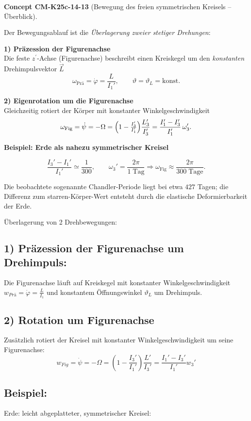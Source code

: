 \documentclass[10pt, letterpaper]{article}
\newcommand{\CustomHeading}[3]{%
  \par\medskip\noindent%
  \textbf{#1 #2} \textnormal{(#3)}.\enskip%
}
\newenvironment{CONC}[2]{\begin{unitbox}\CustomHeading{Concept}{#1}{#2}}{\end{unitbox}}
\begin{document}
\begin{CONC}{CM-K25c-14-13}{Bewegung des freien symmetrischen Kreisels – Überblick}
Der Bewegungsablauf ist die \emph{Überlagerung zweier stetiger Drehungen}:

\textbf{1) Präzession der Figurenachse}\\
Die feste $z^{\prime}$-Achse (Figurenachse) beschreibt einen Kreiskegel um den \emph{konstanten} Drehimpuls­vektor $\vec L$  
\[
\omega_{\text{Prä}}=\dot{\varphi}= \frac{L}{I_1'},
\qquad
\vartheta=\vartheta_L=\text{konst}.
\]

\textbf{2) Eigenrotation um die Figurenachse}\\
Gleichzeitig rotiert der Körper mit konstanter Winkelgeschwindigkeit  
\[
\omega_{\text{Fig}}=\dot{\psi}
          =-\Omega
          =\Bigl(1-\tfrac{I_3'}{I_1'}\Bigr)\frac{L_3'}{I_3'}
          =\frac{I_1'-I_3'}{I_1'}\,\omega_3'.
\]

\bigskip
\textbf{Beispiel: Erde als nahezu symmetrischer Kreisel}

\[
\frac{I_3'-I_1'}{I_1'}\simeq\frac{1}{300},
\qquad
\omega_3'=\frac{2\pi}{1\;\text{Tag}}
\Longrightarrow
\omega_{\text{Fig}}\approx\frac{2\pi}{300\;\text{Tage}}.
\]

Die beobachtete sogenannte Chandler-Periode liegt bei etwa $427$ Tagen; die Differenz zum starren-Körper-Wert entsteht durch die elastische Deformierbarkeit der Erde.
\end{CONC}





Überlagerung von 2 Drehbewegungen:


\subsection*{1) Präzession der Figurenachse um Drehimpuls:}
Die Figurenachse läuft auf Kreiskegel mit konstanter Winkelgeschwindigkeit $w_{Prä} = \dot{\varphi} = \frac{L}{I_1}$ und konstantem Öffnungswinkel $\vartheta_L$ um Drehimpuls.

\subsection*{2) Rotation um Figurenachse}
Zusätzlich rotiert der Kreisel mit konstanter Winkelgeschwindigkeit um seine Figurenachse:
\[w_{Fig} = \dot{\psi} = -\Omega = \left(1-\frac{I_3'}{I_1'}\right)\frac{L'}{I_3'} = \frac{I_1'-I_3'}{I_1'} w_3'\]

\subsection*{Beispiel:} Erde: leicht abgeplatteter, symmetrischer Kreisel:
\end{document}

